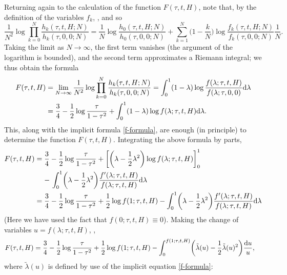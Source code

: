 \documentclass[10pt,a4paper]{amsart}
\numberwithin{equation}{section}
\begin{document}
Returning again to the calculation of the function $F(\tau,t,H)$, note that, by the definition of the variables $f_k$, , and so
 \begin{equation*}
 \frac{1}{N^2} \log \prod_{k=0}^N \frac{h_k(\tau,t,H;N)}{h_k(\tau,0,0;N)} = \frac{1}{N} \log \frac{h_0(\tau,t,H;N)}{h_0(\tau,0,0;N)} + \sum_{k=1}^N \biggl(1-\frac{k}{N}\biggr) \log \frac{f_k(\tau,t,H;N)}{f_k(\tau,0,0;N)} \frac{1}{N}.
 \end{equation*}
Taking the limit as $N\to \infty$, the first term vanishes (the argument of the logarithm is bounded), and the second term approximates a
Riemann integral; we thus obtain the formula
 \begin{align}
 F(\tau,t,H) &= \lim_{N \to \infty} \frac{1}{N^2} \log \prod_{k=0}^N \frac{h_k(\tau,t,H;N)}{h_k(\tau,0,0;N)} = \int_{0}^{1}(1-\lambda) \log\frac{f(\lambda;\tau,t,H)}{f(\lambda;\tau,0,0)} {\rm d}\lambda \nonumber \\
 &= \frac{3}{4} - \frac{1}{2}\log \frac{\tau}{1-\tau^2} + \int_{0}^{1}(1-\lambda) \log f(\lambda;\tau,t,H) {\rm d}\lambda \label{Free2}.
 \end{align}
This, along with the implicit formula \eqref{f-formula}, are enough (in principle) to determine the function $F(\tau,t,H)$. Integrating the above formula by parts,
 \begin{align*}
 F(\tau,t,H)={}& \frac{3}{4} - \frac{1}{2}\log \frac{\tau}{1-\tau^2} + \biggl[\biggl(\lambda-\frac{1}{2}\lambda^2\biggr)\log f(\lambda;\tau,t,H)\biggr]_{0}^{1}\\
 &{}{-}\,\int_{0}^{1} \biggl(\lambda-\frac{1}{2}\lambda^2\biggr) \frac{f'(\lambda;\tau,t,H)}{f(\lambda;\tau,t,H)} {\rm d}\lambda\\
={}& \frac{3}{4} - \frac{1}{2}\log \frac{\tau}{1-\tau^2} + \frac{1}{2}\log f(1;\tau,t,H) - \int_{0}^{1}\biggl(\lambda-\frac{1}{2}\lambda^2\biggr)\frac{f'(\lambda;\tau,t,H)}{f(\lambda;\tau,t,H)} {\rm d}\lambda
 \end{align*}
(Here we have used the fact that $f(0;\tau,t,H) \equiv 0$). Making the change of variables $u = f(\lambda;\tau,t,H)$,
,
 \begin{align*}
 &F(\tau,t,H)= \frac{3}{4} - \frac{1}{2}\log \frac{\tau}{1-\tau^2} + \frac{1}{2}\log f(1;\tau,t,H) - \int_{0}^{f(1;\tau,t,H)}\biggl(\tilde{\lambda}(u)-\frac{1}{2}\tilde{\lambda}(u)^2\biggr) \frac{{\rm d}u}{u},
 \end{align*}
where $\tilde{\lambda}(u)$ is defined by use of the implicit equation \eqref{f-formula}:
\end{document}
